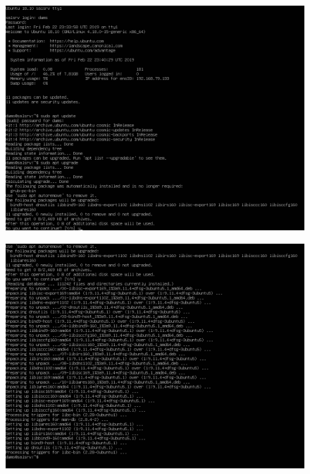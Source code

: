 \begin{figure}[h!]
\centering
\captionsetup{skip=\skipfigurecaptionlen}
\includegraphics[width=1\textwidth]{screenshots/IY2D502-2019-02-22-23-41-29.png}
\caption{}
\label{fig:IY2D502-2019-02-22-23-41-29}
\end{figure}
\pagebreak
\begin{figure}[h!]
\centering
\captionsetup{skip=\skipfigurecaptionlen}
\includegraphics[width=1\textwidth]{screenshots/IY2D502-2019-02-22-23-44-52.png}
\caption{}
\label{fig:IY2D502-2019-02-22-23-44-52}
\end{figure}
\pagebreak
